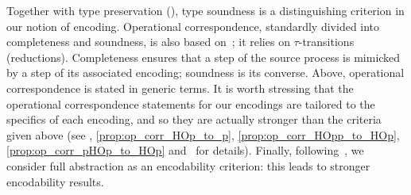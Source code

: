 \documentclass[runningheads]{llncs}
\begin{document}
{{%
Together with type preservation (), type soundness is a distinguishing criterion in our notion of encoding.
Operational correspondence, standardly divided into completeness and soundness, is also based
on~\cite{DBLP:journals/iandc/Gorla10};
it relies on 
$\tau$-transitions (reductions).
Completeness ensures that a step of the source process is mimicked
by a step of its associated encoding; soundness is its converse.
{Above, operational correspondence is stated in generic terms.}
It is worth stressing that 
the operational correspondence statements 
for our encodings 
 are tailored to the specifics of each encoding, and so they
 are actually stronger than the criteria given above
 {(see , \ref{prop:op_corr_HOp_to_p}, \ref{prop:op_corr_HOpp_to_HOp}, \ref{prop:op_corr_pHOp_to_HOp}
 and~\cite{KouzapasPY15} for details).}
Finally, following~\cite{SangiorgiD:expmpa,DBLP:conf/lics/PalamidessiSVV06,Yoshida96},
we consider full abstraction as an encodability criterion: this leads to 
stronger encodability results. 

%
%

}}
\end{document}
